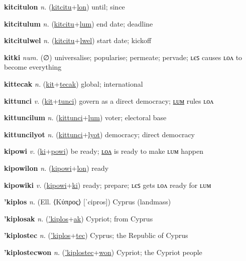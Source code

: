 \textbf{\hypertarget{kitcitulon}{kitcitulon}} \textit{n.} (\hyperlink{kitcitu}{kitcitu}+\allowbreak \hyperlink{lon}{lon})
until; since

\textbf{\hypertarget{kitcitulum}{kitcitulum}} \textit{n.} (\hyperlink{kitcitu}{kitcitu}+\allowbreak \hyperlink{lum}{lum})
end date; deadline

\textbf{\hypertarget{kitcitulwel}{kitcitulwel}} \textit{n.} (\hyperlink{kitcitu}{kitcitu}+\allowbreak \hyperlink{lwel}{lwel})
start date; kickoff

\textbf{\hypertarget{kitki}{kitki}} \textit{num.} (∅)
universalise; popularise; permeate; pervade; ʟєꜱ causes ʟᴏᴧ to become everything

\textbf{\hypertarget{kittecak}{kittecak}} \textit{n.} (\hyperlink{kit}{kit}+\allowbreak \hyperlink{tecak}{tecak})
global; international

\textbf{\hypertarget{kittunci}{kittunci}} \textit{v.} (\hyperlink{kit}{kit}+\allowbreak \hyperlink{tunci}{tunci})
govern as a direct democracy; \hyperlink{kittuncilum}{ʟᴜᴍ} rules ʟᴏᴧ

\textbf{\hypertarget{kittuncilum}{kittuncilum}} \textit{n.} (\hyperlink{kittunci}{kittunci}+\allowbreak \hyperlink{lum}{lum})
voter; electoral base

\textbf{\hypertarget{kittuncilyot}{kittuncilyot}} \textit{n.} (\hyperlink{kittunci}{kittunci}+\allowbreak \hyperlink{lyot}{lyot})
democracy; direct democracy

\textbf{\hypertarget{kipowi}{kipowi}} \textit{v.} (\hyperlink{ki}{ki}+\allowbreak \hyperlink{powi}{powi})
be ready; \hyperlink{kipowilon}{ʟᴏᴧ} is ready to make ʟᴜᴍ happen

\textbf{\hypertarget{kipowilon}{kipowilon}} \textit{n.} (\hyperlink{kipowi}{kipowi}+\allowbreak \hyperlink{lon}{lon})
ready

\textbf{\hypertarget{kipowiki}{kipowiki}} \textit{v.} (\hyperlink{kipowi}{kipowi}+\allowbreak \hyperlink{ki}{ki})
ready; prepare; ʟєꜱ gets ʟᴏᴧ ready for ʟᴜᴍ

\textbf{\hypertarget{'kiplos}{'kiplos}} \textit{n.} (Ell. ⟨Κύπρος⟩ [ˈcipros])
Cyprus (landmass)

\textbf{\hypertarget{'kiplosak}{'kiplosak}} \textit{n.} (\hyperlink{'kiplos}{'kiplos}+\allowbreak \hyperlink{ak}{ak})
Cypriot; from Cyprus

\textbf{\hypertarget{'kiplostec}{'kiplostec}} \textit{n.} (\hyperlink{'kiplos}{'kiplos}+\allowbreak \hyperlink{tec}{tec})
Cyprus; the Republic of Cyprus

\textbf{\hypertarget{'kiplostecwon}{'kiplostecwon}} \textit{n.} (\hyperlink{'kiplostec}{'kiplostec}+\allowbreak \hyperlink{won}{won})
Cypriot; the Cypriot people

